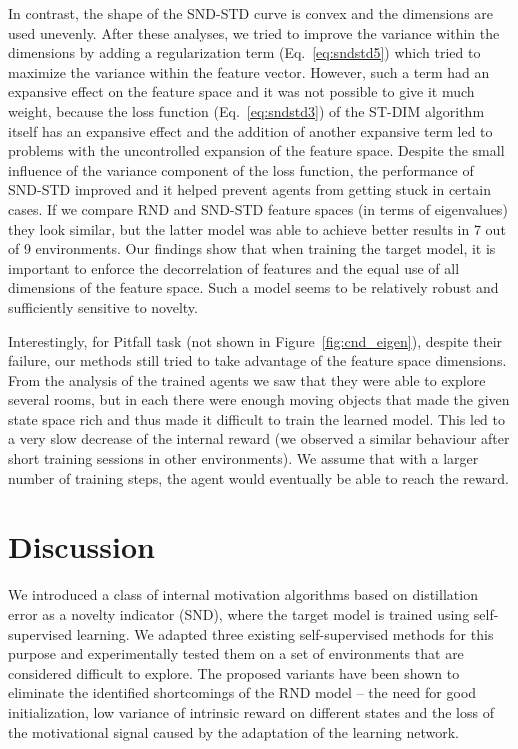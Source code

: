 \documentclass[a4paper,11pt]{elsarticle}
\begin{document}
In contrast, the shape of the SND-STD curve is convex and the dimensions are used unevenly. After these analyses, we tried to improve the variance within the dimensions by adding a regularization term (Eq.~\ref{eq:sndstd5}) which tried to maximize the variance within the feature vector. However, such a term had an expansive effect on the feature space and it was not possible to give it much weight, because the loss function (Eq.~\ref{eq:sndstd3}) of the ST-DIM algorithm itself has an expansive effect and the addition of another expansive term led to problems with the uncontrolled expansion of the feature space. 
Despite the small influence of the variance component of the loss function, the performance of SND-STD improved and it helped prevent agents from getting stuck in certain cases. If we compare RND and SND-STD feature spaces (in terms of eigenvalues) they look similar, but the latter model was able to achieve better results in 7 out of 9 environments. Our findings show that when training the target model, it is important to enforce the decorrelation of features and the equal use of all dimensions of the feature space. Such a model seems to be relatively robust and sufficiently sensitive to novelty.

Interestingly, for Pitfall task (not shown in Figure~\ref{fig:cnd_eigen}), despite their failure, our methods still tried to take advantage of the feature space dimensions. 
From the analysis of the trained agents we saw that they were able to explore several rooms, but in each there were enough moving objects that made the given state space rich and thus made it difficult to train the learned model. This led to a very slow decrease of the internal reward (we observed a similar behaviour after short training sessions in other environments). We assume that with a larger number of training steps, the agent would eventually be able to reach the reward.

\section{Discussion}
\label{sec:discussion}

We introduced a class of internal motivation algorithms based on distillation error as a novelty indicator (SND), where the target model is trained using self-supervised learning. We adapted three existing self-supervised methods for this purpose and experimentally tested them on a set of environments that are considered difficult to explore.
The proposed variants have been shown to eliminate the identified shortcomings of the RND model -- the need for good initialization, low variance of intrinsic reward on different states and the loss of the motivational signal caused by the adaptation of the learning network.
\end{document}
